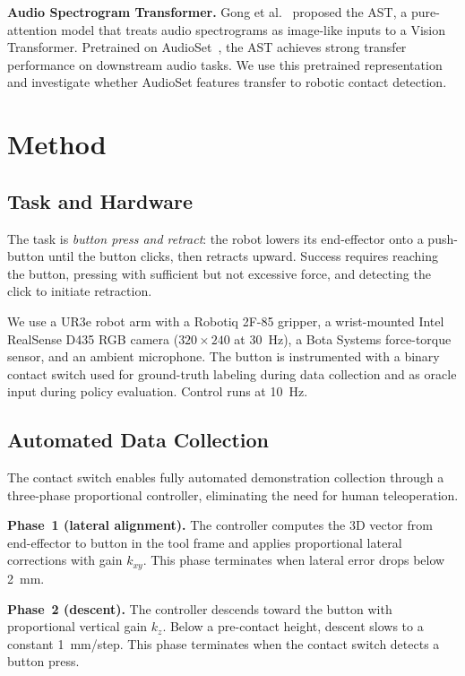 \documentclass[conference]{IEEEtran}
\begin{document}
\textbf{Audio Spectrogram Transformer.}
Gong et al.~\cite{gong2021ast} proposed the AST, a pure-attention model that treats audio spectrograms as image-like inputs to a Vision Transformer.
Pretrained on AudioSet~\cite{gemmeke2017audioset}, the AST achieves strong transfer performance on downstream audio tasks.
We use this pretrained representation and investigate whether AudioSet features transfer to robotic contact detection.

\section{Method}

\subsection{Task and Hardware}

The task is \emph{button press and retract}: the robot lowers its end-effector onto a push-button until the button clicks, then retracts upward.
Success requires reaching the button, pressing with sufficient but not excessive force, and detecting the click to initiate retraction.

We use a UR3e robot arm with a Robotiq 2F-85 gripper, a wrist-mounted Intel RealSense D435 RGB camera ($320{\times}240$ at 30~Hz), a Bota Systems force-torque sensor, and an ambient microphone.
The button is instrumented with a binary contact switch used for ground-truth labeling during data collection and as oracle input during policy evaluation.
Control runs at 10~Hz.

\subsection{Automated Data Collection}
\label{sec:data_collection}

The contact switch enables fully automated demonstration collection through a three-phase proportional controller, eliminating the need for human teleoperation.

\textbf{Phase~1 (lateral alignment).}
The controller computes the 3D vector from end-effector to button in the tool frame and applies proportional lateral corrections with gain $k_{xy}$.
This phase terminates when lateral error drops below 2~mm.

\textbf{Phase~2 (descent).}
The controller descends toward the button with proportional vertical gain $k_z$.
Below a pre-contact height, descent slows to a constant 1~mm/step.
This phase terminates when the contact switch detects a button press.
\end{document}
